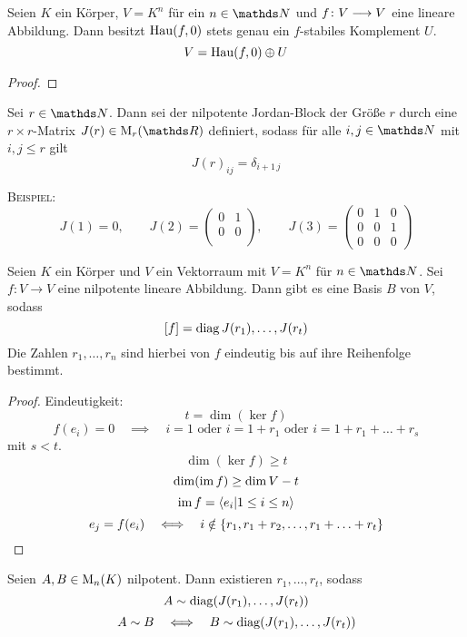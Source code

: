 		\begin{theorem}
			Seien $K$ ein Körper, $V=K^n$ für ein $n\in\SN$ und $f\colon V\longrightarrow V$ eine lineare Abbildung.
			Dann besitzt $\mathrm{Hau}(f,0)$ stets genau ein $f$-stabiles Komplement $U$.
			\[ V = \mathrm{Hau}(f,0)\oplus U \] 
		\end{theorem}
		\begin{proof}
			
		\end{proof}


		\begin{definition}
			Sei $r\in\SN$.
			Dann sei der nilpotente Jordan-Block der Größe $r$ durch eine $r\times r$-Matrix $J(r)\in\m{M}_r(\SR)$ definiert, sodass für alle $i,j\in\SN$ mit $i,j\leq r$ gilt
			\[ J(r)_{ij} = \delta_{i+1\, j} \]
		\end{definition}

		\textsc{Beispiel:}\\
		\[
			J(1) = 0,\qquad
			J(2) =
			\begin{pmatrix}
				0 & 1 \\
				0 & 0 \\
			\end{pmatrix}
			,\qquad J(3) =
			\begin{pmatrix}
				0 & 1 & 0 \\
				0 & 0 & 1 \\
				0 & 0 & 0
			\end{pmatrix}
		\]


		\begin{theorem}
			Seien $K$ ein Körper und $V$ ein Vektorraum mit $V=K^n$ für $n\in\SN$.
			Sei $f:V\longrightarrow V$ eine nilpotente lineare Abbildung.
			Dann gibt es eine Basis $B$ von $V$, sodass 
			\[ \left[ f \right] = \operatorname{diag}{J(r_1),\ldots,J(r_t)} \]
			Die Zahlen $r_1,\ldots,r_n$ sind hierbei von $f$ eindeutig bis auf ihre Reihenfolge bestimmt.
		\end{theorem}
		\begin{proof}
			Eindeutigkeit:
			\[ t = \dim(\ker f) \]
			\[ f(e_i) = 0 \quad \implies \quad i=1 \text{ oder } i = 1+r_1 \text{ oder } i = 1 + r_1 +\ldots +r_s \]
			mit $s< t$.
			\[ \dim(\ker f) \geq t \]
			\[ \dim(\operatorname{im} f) \geq \dim V - t \]
			\[ \operatorname{im} f = \left\langle e_i \vert 1\leq i\leq n \right\rangle \]
			\[ e_j = f(e_i) \quad \Longleftrightarrow \quad i\notin\left\{ r_1,r_1+r_2,\ldots,r_1+\ldots+r_t \right\} \]
		\end{proof}

		\begin{corollary}
			Seien $A,B\in\mathrm{M}_n(K)$ nilpotent.
			Dann existieren $r_1,\ldots,r_t$, sodass
			\[ A\sim\operatorname{diag}(J(r_1),\ldots,J(r_t)) \]
			\[ A\sim B\quad \Longleftrightarrow \quad B\sim\operatorname{diag}(J(r_1),\ldots,J(r_t)) \]
		\end{corollary}

